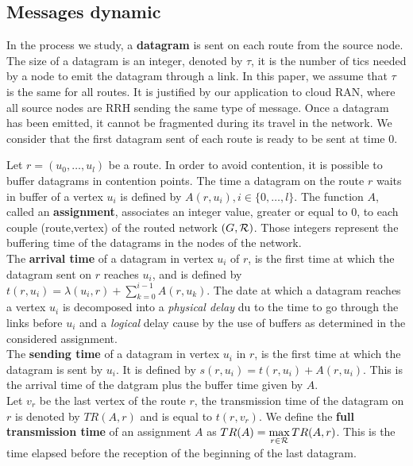 \documentclass[english]{article}
\begin{document}
 \subsection{Messages dynamic}
	     
        In the process we study, a {\bf datagram} is sent on each route from the source node. The size of a datagram is an integer, denoted by $\tau$, it is the number of tics needed by a node to emit the datagram through a link.  In this paper, we assume that $\tau$ is the same for all routes. It is justified by our application to cloud RAN, where all source nodes are RRH sending the same type of message. Once a datagram has been emitted, it cannot be fragmented during its travel in the network. We consider that the first datagram sent of each route is ready to be sent at time $0$.

          Let $r=(u_0,\dots,u_l)$ be a route. In order to avoid contention, it is possible to buffer datagrams in contention points. The time a datagram on the route $r$ waits in buffer of a vertex $u_i$ is defined by $A(r,u_i), i \in \{0,\ldots,l\}$.
          The function $A$, called an \textbf{assignment}, associates an integer value, greater or equal to $0$, to each couple (route,vertex) of the routed network $(G,{\cal R})$. Those integers represent the buffering time of the datagrams in the nodes of the network. \\
       

 The \textbf{arrival time} of a datagram in vertex $u_i$ of $r$, is the first time at which the datagram sent on $r$ reaches $u_i$, and is defined by $t(r,u_i) = \lambda(u_i,r) + \sum_{k=0}^{i-1} A(r,u_k) $. The date at which a datagram reaches a vertex $u_i$ is decomposed into a \emph{physical delay} du to the time to go through the links before $u_i$ and a \emph{logical} delay cause by the use of buffers as determined in the considered assignment.\\
  The \textbf{sending time} of a datagram in vertex $u_i$ in $r$, is the first time at which the datagram is sent by $u_i$. It is defined by $s(r,u_i) = t(r,u_i) +  A(r,u_i) $. This is the arrival time of the datgram plus the buffer time given by $A$.\\
 
  Let $v_r$ be the last vertex of the route $r$, the transmission time of the datagram on 
  $r$ is denoted by $TR(A,r)$ and is equal to $t(r,v_r)$. We define the \textbf{full transmission time} of an assignment $A$ as $TR(A) = \displaystyle \max\limits_{r \in {\cal R}} TR(A,r) $. This is the time elapsed before the reception of the beginning of the last datagram. 
         
\end{document}
